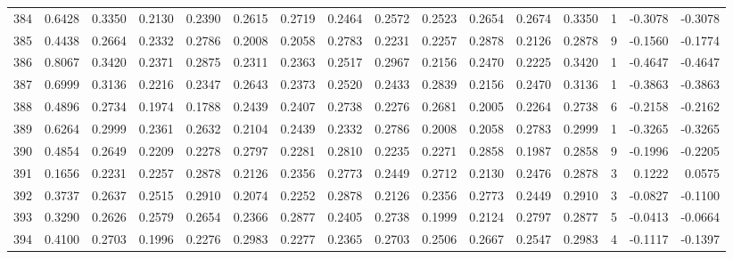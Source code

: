\begin{tabular}{lrrrrrrrrrrrrrrr}
384 &      0.6428 &  0.3350 &  0.2130 &  0.2390 &  0.2615 &  0.2719 &  0.2464 &  0.2572 &  0.2523 &  0.2654 &   0.2674 &     0.3350 &      1 &                   -0.3078 &                    -0.3078 \\
385 &      0.4438 &  0.2664 &  0.2332 &  0.2786 &  0.2008 &  0.2058 &  0.2783 &  0.2231 &  0.2257 &  0.2878 &   0.2126 &     0.2878 &      9 &                   -0.1560 &                    -0.1774 \\
386 &      0.8067 &  0.3420 &  0.2371 &  0.2875 &  0.2311 &  0.2363 &  0.2517 &  0.2967 &  0.2156 &  0.2470 &   0.2225 &     0.3420 &      1 &                   -0.4647 &                    -0.4647 \\
387 &      0.6999 &  0.3136 &  0.2216 &  0.2347 &  0.2643 &  0.2373 &  0.2520 &  0.2433 &  0.2839 &  0.2156 &   0.2470 &     0.3136 &      1 &                   -0.3863 &                    -0.3863 \\
388 &      0.4896 &  0.2734 &  0.1974 &  0.1788 &  0.2439 &  0.2407 &  0.2738 &  0.2276 &  0.2681 &  0.2005 &   0.2264 &     0.2738 &      6 &                   -0.2158 &                    -0.2162 \\
389 &      0.6264 &  0.2999 &  0.2361 &  0.2632 &  0.2104 &  0.2439 &  0.2332 &  0.2786 &  0.2008 &  0.2058 &   0.2783 &     0.2999 &      1 &                   -0.3265 &                    -0.3265 \\
390 &      0.4854 &  0.2649 &  0.2209 &  0.2278 &  0.2797 &  0.2281 &  0.2810 &  0.2235 &  0.2271 &  0.2858 &   0.1987 &     0.2858 &      9 &                   -0.1996 &                    -0.2205 \\
391 &      0.1656 &  0.2231 &  0.2257 &  0.2878 &  0.2126 &  0.2356 &  0.2773 &  0.2449 &  0.2712 &  0.2130 &   0.2476 &     0.2878 &      3 &                    0.1222 &                     0.0575 \\
392 &      0.3737 &  0.2637 &  0.2515 &  0.2910 &  0.2074 &  0.2252 &  0.2878 &  0.2126 &  0.2356 &  0.2773 &   0.2449 &     0.2910 &      3 &                   -0.0827 &                    -0.1100 \\
393 &      0.3290 &  0.2626 &  0.2579 &  0.2654 &  0.2366 &  0.2877 &  0.2405 &  0.2738 &  0.1999 &  0.2124 &   0.2797 &     0.2877 &      5 &                   -0.0413 &                    -0.0664 \\
394 &      0.4100 &  0.2703 &  0.1996 &  0.2276 &  0.2983 &  0.2277 &  0.2365 &  0.2703 &  0.2506 &  0.2667 &   0.2547 &     0.2983 &      4 &                   -0.1117 &                    -0.1397 \\

\end{tabular}
